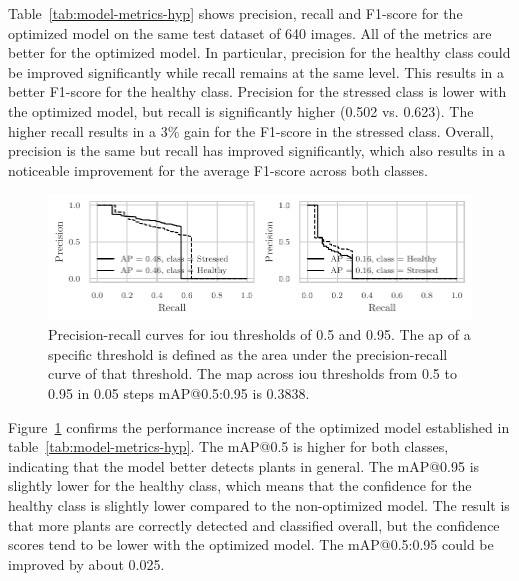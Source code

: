 \documentclass[draft,final]{vutinfth} %
\begin{document}
Table~\ref{tab:model-metrics-hyp} shows precision, recall and F1-score
for the optimized model on the same test dataset of 640 images. All of
the metrics are better for the optimized model. In particular,
precision for the healthy class could be improved significantly while
recall remains at the same level. This results in a better F1-score
for the healthy class. Precision for the stressed class is lower with
the optimized model, but recall is significantly higher (0.502
vs. 0.623). The higher recall results in a 3\% gain for the F1-score
in the stressed class. Overall, precision is the same but recall has
improved significantly, which also results in a noticeable improvement
for the average F1-score across both classes.

\begin{figure}
  \centering
  \includegraphics{graphics/APModel-model-original-relabeled.pdf}
  \caption[Optimized aggregate model AP@0.5 and
  AP@0.95.]{Precision-recall curves for \gls{iou} thresholds of 0.5
    and 0.95. The \gls{ap} of a specific threshold is defined as the
    area under the precision-recall curve of that threshold. The
    \gls{map} across \gls{iou} thresholds from 0.5 to 0.95 in 0.05
    steps \textsf{mAP}@0.5:0.95 is 0.3838.}
  \label{fig:aggregate-ap-hyp}
\end{figure}

Figure~\ref{fig:aggregate-ap-hyp} confirms the performance increase of
the optimized model established in
table~\ref{tab:model-metrics-hyp}. The \textsf{mAP}@0.5 is higher for
both classes, indicating that the model better detects plants in
general. The \textsf{mAP}@0.95 is slightly lower for the healthy
class, which means that the confidence for the healthy class is
slightly lower compared to the non-optimized model. The result is that
more plants are correctly detected and classified overall, but the
confidence scores tend to be lower with the optimized model. The
\textsf{mAP}@0.5:0.95 could be improved by about 0.025.

\backmatter

\listoffigures %

\cleardoublepage %
\listoftables %

\listofalgorithms
{}

\printindex

\printglossaries

%
\printbibliography
\end{document}
